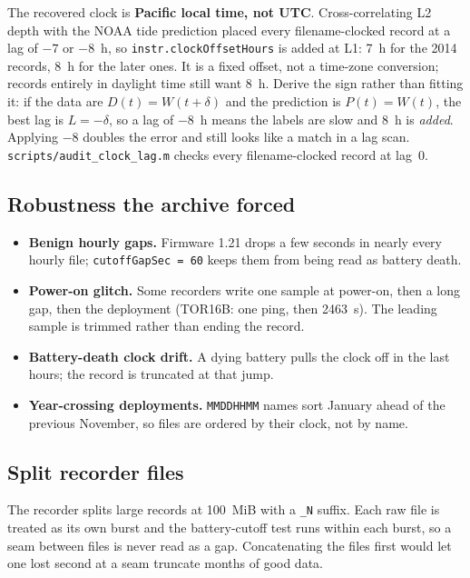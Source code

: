 \documentclass[11pt]{article}
\newcommand{\code}[1]{\texttt{#1}}
\begin{document}
The recovered clock is \textbf{Pacific local time, not UTC}. Cross-correlating L2 depth with
the NOAA tide prediction placed every filename-clocked record at a lag of $-7$ or $-8$~h, so
\code{instr.clockOffsetHours} is added at L1: 7~h for the 2014 records, 8~h for the later ones.
It is a fixed offset, not a time-zone conversion; records entirely in daylight time still want
8~h. Derive the sign rather than fitting it: if the data are $D(t) = W(t+\delta)$ and the
prediction is $P(t) = W(t)$, the best lag is $L = -\delta$, so a lag of $-8$~h means the labels
are slow and 8~h is \emph{added}. Applying $-8$ doubles the error and still looks like a match
in a lag scan. \code{scripts/audit\_clock\_lag.m} checks every filename-clocked record at lag~0.

\subsection{Robustness the archive forced}

\begin{itemize}
\item \textbf{Benign hourly gaps.} Firmware 1.21 drops a few seconds in nearly every hourly file;
  \code{cutoffGapSec = 60} keeps them from being read as battery death.
\item \textbf{Power-on glitch.} Some recorders write one sample at power-on, then a long gap,
  then the deployment (TOR16B: one ping, then 2463~s). The leading sample is trimmed rather than
  ending the record.
\item \textbf{Battery-death clock drift.} A dying battery pulls the clock off in the last hours;
  the record is truncated at that jump.
\item \textbf{Year-crossing deployments.} \code{MMDDHHMM} names sort January ahead of the
  previous November, so files are ordered by their clock, not by name.
\end{itemize}

\subsection{Split recorder files}

The recorder splits large records at 100~MiB with a \code{\_N} suffix. Each raw file is treated
as its own burst and the battery-cutoff test runs within each burst, so a seam between files
is never read as a gap. Concatenating the files first would let one lost second at a seam
truncate months of good data.
\end{document}

